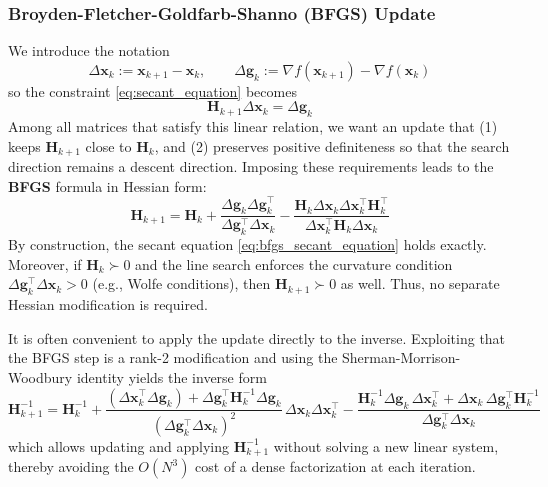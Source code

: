 \subsubsection{Broyden-Fletcher-Goldfarb-Shanno (BFGS) Update}
We introduce the notation
\begin{equation}
\Delta\mathbf{x}_k := \mathbf{x}_{k+1}-\mathbf{x}_k,
\qquad
\Delta\mathbf{g}_k := \nabla f(\mathbf{x}_{k+1})-\nabla f(\mathbf{x}_k)
\end{equation}
so the constraint \autoref{eq:secant_equation} becomes 
\begin{equation}
    \mathbf{H}_{k+1}\Delta\mathbf{x}_k=\Delta\mathbf{g}_k
    \label{eq:bfgs_secant_equation}
\end{equation}
Among all matrices that satisfy this linear relation, we want an update that (1) keeps \(\mathbf{H}_{k+1}\) close to \(\mathbf{H}_k\), and (2) preserves positive definiteness so that the search direction remains a descent direction. Imposing these requirements leads to the \textbf{BFGS} formula in Hessian form:
\begin{equation}
    \mathbf{H}_{k+1}
    = \mathbf{H}_k
    + \frac{\Delta\mathbf{g}_k\Delta\mathbf{g}_k^{\!\top}}{\Delta\mathbf{g}_k^{\!\top}\Delta\mathbf{x}_k}
    - \frac{\mathbf{H}_k\Delta\mathbf{x}_k\Delta\mathbf{x}_k^{\!\top}\mathbf{H}_k^{\!\top}}
        {\Delta\mathbf{x}_k^{\!\top}\mathbf{H}_k\Delta\mathbf{x}_k}
    \label{eq:bfgs_hessian_form}
\end{equation}
By construction, the secant equation \autoref{eq:bfgs_secant_equation} holds exactly. Moreover, if \(\mathbf{H}_k\succ0\) and the line search enforces the curvature condition \(\Delta\mathbf{g}_k^{\!\top}\Delta\mathbf{x}_k>0\) (e.g., Wolfe conditions), then \(\mathbf{H}_{k+1}\succ0\) as well. Thus, no separate Hessian modification is required.

It is often convenient to apply the update directly to the inverse. Exploiting that the BFGS step is a rank-2 modification and using the Sherman-Morrison-Woodbury identity yields the inverse form
\begin{equation}
    \mathbf{H}_{k+1}^{-1}
    = \mathbf{H}_k^{-1}
    + \frac{(\Delta\mathbf{x}_k^{\!\top}\Delta\mathbf{g}_k)+\Delta\mathbf{g}_k^{\!\top}\mathbf{H}_k^{-1}\Delta\mathbf{g}_k}
        {(\Delta\mathbf{g}_k^{\!\top}\Delta\mathbf{x}_k)^2}\,
    \Delta\mathbf{x}_k\Delta\mathbf{x}_k^{\!\top}
    - \frac{\mathbf{H}_k^{-1}\Delta\mathbf{g}_k\,\Delta\mathbf{x}_k^{\!\top}
            + \Delta\mathbf{x}_k\,\Delta\mathbf{g}_k^{\!\top}\mathbf{H}_k^{-1}}
        {\Delta\mathbf{g}_k^{\!\top}\Delta\mathbf{x}_k}
    \label{eq:bfgs_inverse_form}
\end{equation}
which allows updating and applying \(\mathbf{H}_{k+1}^{-1}\) without solving a new linear system, thereby avoiding the \(O(N^3)\) cost of a dense factorization at each iteration.

